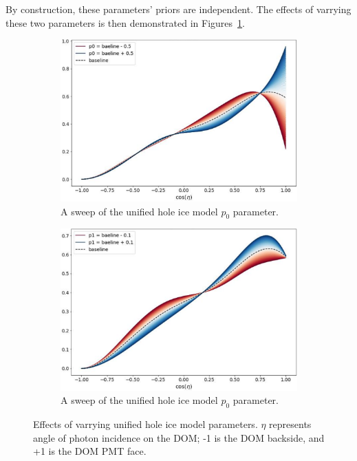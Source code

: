 \documentclass[main.tex]{subfiles}
\begin{document}
By construction, these parameters' priors are independent.
The effects of varrying these two parameters is then demonstrated in Figures~\ref{fig:holeiceparmas}.

\begin{figure}
    \centering
    \begin{subfigure}{.45\textwidth}
        \centering
        \includegraphics[width=0.95\linewidth]{./figures/holeice_p0.png}
        \caption{A sweep of the unified hole ice model $p_0$ parameter.}
    \end{subfigure}%
    \begin{subfigure}{.45\textwidth}
        \centering
        \includegraphics[width=0.95\linewidth]{./figures/holeice_p1.png}
        \caption{A sweep of the unified hole ice model $p_0$ parameter.}
    \end{subfigure}
    \caption{Effects of varrying unified hole ice model parameters. $\eta$ represents angle of photon incidence on the DOM; -1 is the DOM backside, and +1 is the DOM PMT face.}\label{fig:holeiceparmas}
\end{figure}
\end{document}
